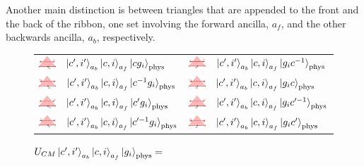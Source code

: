 \documentclass[two column]{article}
\begin{document}
Another main distinction is between triangles that are appended to the front and the back of the ribbon, one set involving the forward ancilla, $a_f$, and the other backwards ancilla, $a_b$, respectively. 
\begin{figure}
\centering
\caption*{$U_{CM}\ket{c', i'}_{a_b}\ket{c, i}_{a_f}\ket{g_i}_{\text{phys}} = $}
\vspace{10pt}
	\begin{tabular}{llll}
 \includegraphics[width=0.12\linewidth]{Figures/IRgf.pdf} &   $\ket{c', i'}_{a_b}\ket{c, i}_{a_f}\ket{cg_i}_{\text{phys}}$ &  \includegraphics[width=0.12\linewidth]{Figures/IRif.pdf}           &       $\ket{c', i'}_{a_b}\ket{c, i}_{a_f}\ket{g_i c^{-1}}_{\text{phys}}$                  \\ 
\includegraphics[width=0.12\linewidth]{Figures/ILif.pdf} &   $\ket{c', i'}_{a_b}\ket{c, i}_{a_f}\ket{c^{-1}g_i}_{\text{phys}}$ &  \includegraphics[width=0.12\linewidth]{Figures/ILgf.pdf}           &       $\ket{c', i'}_{a_b}\ket{c, i}_{a_f}\ket{g_i c}_{\text{phys}}$                  \\  
 \includegraphics[width=0.12\linewidth]{Figures/IRgb.pdf} &   $\ket{c', i'}_{a_b}\ket{c, i}_{a_f}\ket{c'g_i}_{\text{phys}}$ &  \includegraphics[width=0.12\linewidth]{Figures/IRib.pdf}           &       $\ket{c', i'}_{a_b}\ket{c, i}_{a_f}\ket{g_i c'^{-1}}_{\text{phys}}$                  \\ 
\includegraphics[width=0.12\linewidth]{Figures/ILib.pdf} &   $\ket{c', i'}_{a_b}\ket{c, i}_{a_f}\ket{c'^{-1}g_i}_{\text{phys}}$ &  \includegraphics[width=0.12\linewidth]{Figures/ILgb.pdf}           &       $\ket{c', i'}_{a_b}\ket{c, i}_{a_f}\ket{g_i c'}_{\text{phys}}$                  \\  

\end{tabular}
\end{figure}
\end{document}
